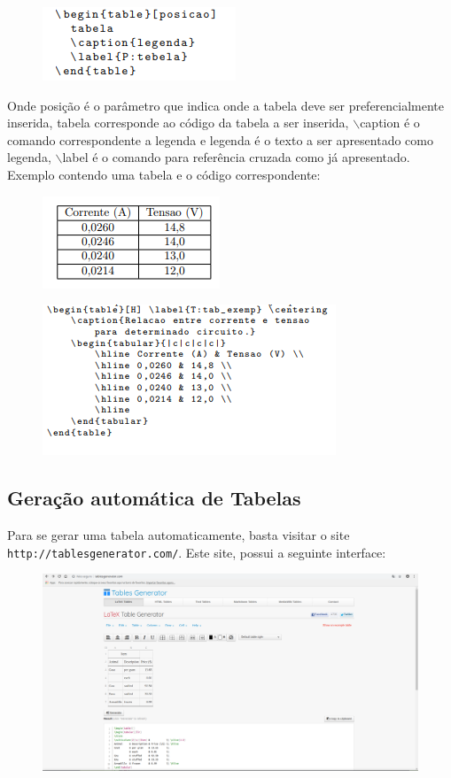 \documentclass[12pt]{article}
\begin{document}
					\begin{figure}[h]
						\includegraphics[scale=0.7]{a.png}
					\end{figure}
					Onde posição é o parâmetro que indica onde a tabela deve ser preferencialmente inserida, tabela corresponde ao código da tabela a ser inserida, $\backslash$caption é o comando correspondente a legenda e legenda é o texto a ser apresentado como legenda, $\backslash$label é o comando para referência cruzada como já apresentado.
					Exemplo contendo uma tabela e o código correspondente:
					\begin{figure}[h]
						\includegraphics[scale=0.7]{q.png}
					\end{figure}
					\begin{figure}[h]
						\includegraphics[scale=0.7]{qq.png}
					\end{figure}
		
		\subsection{Geração automática de Tabelas}
			Para se gerar uma tabela automaticamente, basta visitar o site \texttt{http://tablesgenerator.com/}. Este site, possui a seguinte interface:
			
			\begin{figure}[h]
				\centering
				\includegraphics[scale=0.1]{ca.png}
			\end{figure}
			
\end{document}
